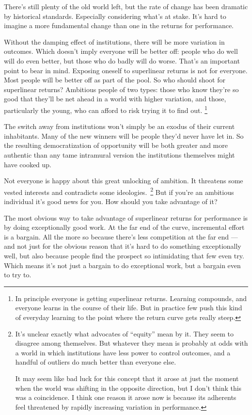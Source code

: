 \documentclass[12pt]{book}
\begin{document}
There's still plenty of the old world left, but the rate of change has
been dramatic by historical standards. Especially considering what's at
stake. It's hard to imagine a more fundamental change than one in the
returns for performance.

Without the damping effect of institutions, there will be more variation
in outcomes. Which doesn't imply everyone will be better off: people who
do well will do even better, but those who do badly will do worse.
That's an important point to bear in mind. Exposing oneself to
superlinear returns is not for everyone. Most people will be better off
as part of the pool. So who should shoot for superlinear returns?
Ambitious people of two types: those who know they're so good that
they'll be net ahead in a world with higher variation, and those,
particularly the young, who can afford to risk trying it to find out.
\footnote{In principle everyone is getting superlinear returns. Learning
compounds, and everyone learns in the course of their life. But in
practice few push this kind of everyday learning to the point where the
return curve gets really steep.}

The switch away from institutions won't simply be an exodus of their
current inhabitants. Many of the new winners will be people they'd never
have let in. So the resulting democratization of opportunity will be
both greater and more authentic than any tame intramural version the
institutions themselves might have cooked up.

Not everyone is happy about this great unlocking of ambition. It
threatens some vested interests and contradicts some
ideologies.~\footnote{It's unclear exactly what advocates of ``equity'' mean by it.
They seem to disagree among themselves. But whatever they mean is
probably at odds with a world in which institutions have less power to
control outcomes, and a handful of outliers do much better than everyone
else.

It may seem like bad luck for this concept that it arose at just the
moment when the world was shifting in the opposite direction, but I
don't think this was a coincidence. I think one reason it arose now is
because its adherents feel threatened by rapidly increasing variation in
performance.} But if you're an ambitious
individual it's good news for you. How should you take advantage of it?

The most obvious way to take advantage of superlinear returns for
performance is by doing exceptionally good work. At the far end of the
curve, incremental effort is a bargain. All the more so because there's
less competition at the far end --- and not just for the obvious reason
that it's hard to do something exceptionally well, but also because
people find the prospect so intimidating that few even try. Which means
it's not just a bargain to do exceptional work, but a bargain even to
try to.
\end{document}
